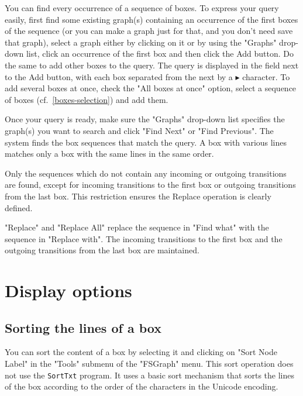 \noindent
You can find every occurrence of a sequence of boxes. To express your query easily,
first find some existing graph(s) containing an occurrence of the first boxes of the
sequence (or you can make a graph just for that, and you don’t need save that graph),
select a graph either by clicking on it or by using the "Graphs" drop-down list, click an
occurrence of the first box and then click the Add button. Do the same to add other
boxes to the query. The query is displayed in the field next to the Add button, with
each box separated from the next by a $\blacktriangleright$ character.
To add several boxes at once, check the "All boxes at once" option, select a sequence
of boxes (cf.~\ref{boxes-selection}) and add them.

\bigskip
\noindent Once your query is ready, make sure the "Graphs" drop-down list
specifies the graph(s) you want to search and click "Find Next" or "Find Previous".
The system finds the box sequences that match the query. A box with various lines
matches only a box with the same lines in the same order.

\bigskip
\noindent Only the sequences which do not contain any incoming or outgoing
transitions are found, except for incoming transitions to the first box or outgoing
transitions from the last box. This restriction ensures the Replace operation is clearly
defined.

\bigskip
\noindent "Replace" and "Replace All" replace the sequence in "Find what" with the sequence in "Replace with". The incoming transitions to the first box and the outgoing transitions from the last box are maintained.

\section{Display options}

\subsection{Sorting the lines of a box}
You can sort the content of a box by selecting it and clicking on "Sort Node
Label" in the "Tools" submenu of the "FSGraph" menu. This sort operation does
not use the \verb+SortTxt+ program. It uses a basic sort mechanism that sorts
the lines of the box according to the order of the characters in the Unicode
encoding.

